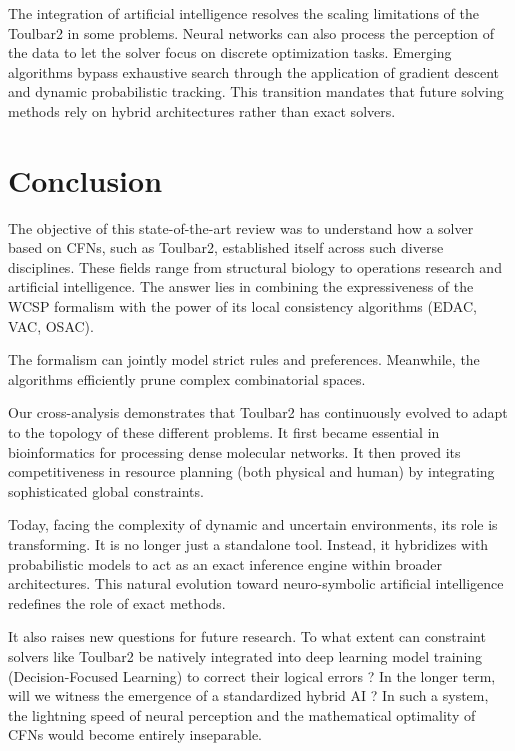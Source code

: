 \documentclass[a4paper]{article}
\begin{document}
The integration of artificial intelligence resolves the scaling limitations of the Toulbar2 in some problems.
Neural networks can also process the perception of the data to let the solver focus on discrete optimization tasks.
Emerging algorithms bypass exhaustive search through the application of gradient descent and dynamic probabilistic tracking.
This transition mandates that future solving methods rely on hybrid architectures rather than exact solvers.

\clearpage
\section{Conclusion}

The objective of this state-of-the-art review was to understand how a solver based on \acp{CFN}, such as Toulbar2, established itself across such diverse disciplines. These fields range from structural biology to operations research and artificial intelligence. The answer lies in combining the expressiveness of the \ac{WCSP} formalism with the power of its local consistency algorithms (EDAC, VAC, OSAC).
\newline

The formalism can jointly model strict rules and preferences. Meanwhile, the algorithms efficiently prune complex combinatorial spaces.

Our cross-analysis demonstrates that Toulbar2 has continuously evolved to adapt to the topology of these different problems. It first became essential in bioinformatics for processing dense molecular networks. It then proved its competitiveness in resource planning (both physical and human) by integrating sophisticated global constraints.
\newline

Today, facing the complexity of dynamic and uncertain environments, its role is transforming. It is no longer just a standalone tool. Instead, it hybridizes with probabilistic models to act as an exact inference engine within broader architectures. This natural evolution toward neuro-symbolic artificial intelligence redefines the role of exact methods.
\newline 

It also raises new questions for future research. To what extent can constraint solvers like Toulbar2 be natively integrated into deep learning model training (Decision-Focused Learning) to correct their logical errors ? In the longer term, will we witness the emergence of a standardized hybrid AI ? In such a system, the lightning speed of neural perception and the mathematical optimality of \acp{CFN} would become entirely inseparable.
\end{document}

